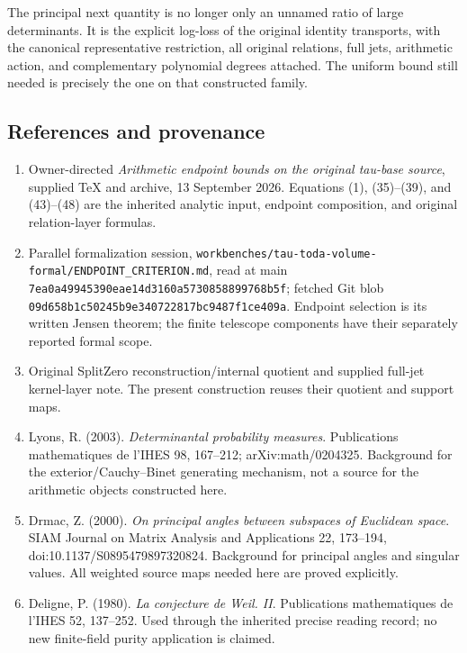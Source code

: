 The principal next quantity is no longer only an unnamed ratio of large determinants. It is the explicit log-loss of the original identity transports, with the canonical representative restriction, all original relations, full jets, arithmetic action, and complementary polynomial degrees attached. The uniform bound still needed is precisely the one on that constructed family.

\subsection{References and provenance}\label{endpoint-restriction_original--references-and-provenance}

\begin{enumerate}
\def\labelenumi{\arabic{enumi}.}
\tightlist
\item
  Owner-directed \emph{Arithmetic endpoint bounds on the original tau-base source}, supplied TeX and archive, 13 September 2026. Equations (1), (35)--(39), and (43)--(48) are the inherited analytic input, endpoint composition, and original relation-layer formulas.
\item
  Parallel formalization session, \texttt{workbenches/tau-toda-volume-formal/ENDPOINT\_CRITERION.md}, read at main \texttt{7ea0a49945390eae14d3160a5730858899768b5f}; fetched Git blob \texttt{09d658b1c50245b9e340722817bc9487f1ce409a}. Endpoint selection is its written Jensen theorem; the finite telescope components have their separately reported formal scope.
\item
  Original SplitZero reconstruction/internal quotient and supplied full-jet kernel-layer note. The present construction reuses their quotient and support maps.
\item
  Lyons, R. (2003). \emph{Determinantal probability measures}. Publications mathematiques de l'IHES 98, 167--212; arXiv:math/0204325. Background for the exterior/Cauchy--Binet generating mechanism, not a source for the arithmetic objects constructed here.
\item
  Drmac, Z. (2000). \emph{On principal angles between subspaces of Euclidean space}. SIAM Journal on Matrix Analysis and Applications 22, 173--194, doi:10.1137/S0895479897320824. Background for principal angles and singular values. All weighted source maps needed here are proved explicitly.
\item
  Deligne, P. (1980). \emph{La conjecture de Weil. II}. Publications mathematiques de l'IHES 52, 137--252. Used through the inherited precise reading record; no new finite-field purity application is claimed.
\end{enumerate}

